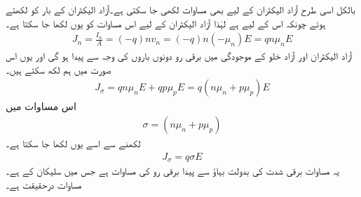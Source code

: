 بالکل اسی طرح آزاد الیکٹران کے لیے بھی مساوات لکھی جا سکتی ہے۔آزاد الیکٹران کے بار کو  لکھتے ہوئے چونکہ اس کے لیے  ہے لہٰذا آزاد الیکٹران کے لیے اس مساوات کو یوں لکھا جا سکتا ہے۔
\begin{align}
J_n = \frac{I_n}{A}=(-q) n v_n = (-q) n (-\mu_n) E = q n \mu_n E
\end{align}
	آزاد الیکٹران اور آزاد خلو کے موجودگی میں برقی رو دونوں باروں کی وجہ سے پیدا ہو گی اور یوں اس صورت میں ہم لکھ سکتے ہیں۔
\begin{align}
J_\sigma=q n \mu_n E+ q p \mu_p E=q (n \mu_n+p \mu_p)E
\end{align}
اس مساوات میں  
\begin{align}
\sigma = (n \mu_n+p \mu_p)
\end{align}
لکھنے سے اسے یوں لکھا جا سکتا ہے۔
\begin{align} \label{مساوات_ڈایوڈ_اہم_کا_قانون_الف}
J_\sigma = q \sigma E
\end{align}
یہ مساوات برقی شدت کی بدولت بہاؤ سے پیدا برقی رو کی مساوات ہے جس میں سلیکان کے   ہے۔مساوات   درحقیقت   ہے۔


